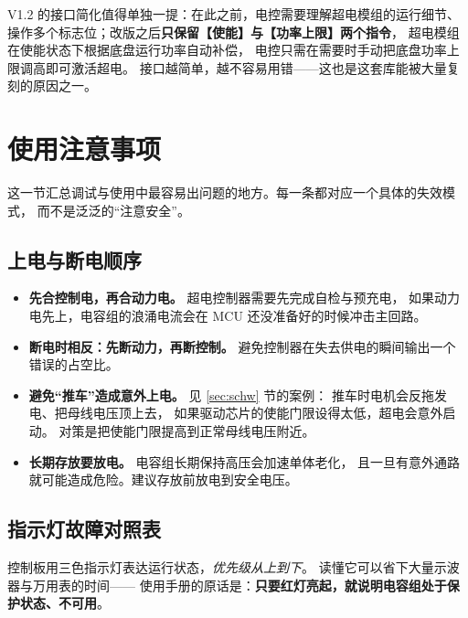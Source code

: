 \documentclass[cn,blue,11pt,device=normal]{elegantnote}
\begin{document}
V1.2 的接口简化值得单独一提：在此之前，电控需要理解超电模组的运行细节、
操作多个标志位；改版之后\textbf{只保留【使能】与【功率上限】两个指令}，
超电模组在使能状态下根据底盘运行功率自动补偿，
电控只需在需要时手动把底盘功率上限调高即可激活超电。
接口越简单，越不容易用错——这也是这套库能被大量复刻的原因之一。

\section{使用注意事项}\label{sec:scnotes}

这一节汇总调试与使用中最容易出问题的地方。每一条都对应一个具体的失效模式，
而不是泛泛的“注意安全”。

\subsection{上电与断电顺序}

\begin{itemize}
  \item \textbf{先合控制电，再合动力电。}
  超电控制器需要先完成自检与预充电，
  如果动力电先上，电容组的浪涌电流会在 MCU 还没准备好的时候冲击主回路。
  \item \textbf{断电时相反：先断动力，再断控制。}
  避免控制器在失去供电的瞬间输出一个错误的占空比。
  \item \textbf{避免“推车”造成意外上电。} 见 \ref{sec:schw} 节的案例：
  推车时电机会反拖发电、把母线电压顶上去，
  如果驱动芯片的使能门限设得太低，超电会意外启动。
  对策是把使能门限提高到正常母线电压附近。
  \item \textbf{长期存放要放电。} 电容组长期保持高压会加速单体老化，
  且一旦有意外通路就可能造成危险。建议存放前放电到安全电压。
\end{itemize}

\subsection{指示灯故障对照表}

控制板用三色指示灯表达运行状态，\emph{优先级从上到下}。
读懂它可以省下大量示波器与万用表的时间——
使用手册的原话是：\textbf{只要红灯亮起，就说明电容组处于保护状态、不可用}。
\end{document}
